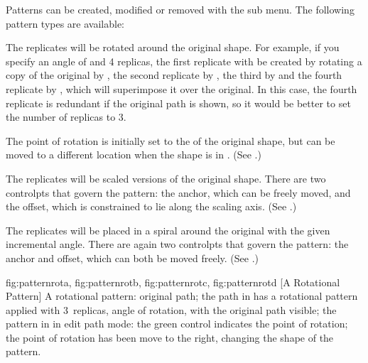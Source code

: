 Patterns can be created, modified or removed with the
 sub menu. The following pattern types
are available:
\begin{deflist}

\begin{itemdesc}
The replicates will be rotated around the original
shape. For example, if you specify an angle of  and 4
replicas, the first replicate with be created by rotating a copy of
the original by , the second replicate by ,
the third by  and the fourth replicate by
, which will superimpose it over the original.
In this case, the fourth replicate is redundant if the original path
is shown, so it would be better to set the number of replicas to 3.

The point of rotation is initially set to the  of the original
shape, but can be moved to a different location when the shape is in
\editpathmode. (See .)

\end{itemdesc}


\begin{itemdesc}
The replicates will be scaled versions of the original
shape. There are two \glspl{controlpt} that govern the pattern: the
anchor, which can be freely moved, and the offset, which is
constrained to lie along the scaling axis. (See
.)
\end{itemdesc}


\begin{itemdesc}
The replicates will be placed in a spiral around the
original with the given incremental angle. There are again two
\glspl{controlpt} that govern the pattern: the anchor and offset,
which can both be moved freely. (See .)
\end{itemdesc}

\end{deflist}

{
  {fig:patternrota}{}{},
  {fig:patternrotb}{}{},
  {fig:patternrotc}{}{},
  {fig:patternrotd}{}{}
}
[A Rotational Pattern]
{A rotational pattern: 
 original path; 
 the path 
in  has a rotational pattern applied with 3~replicas, 
 angle of rotation, with the original path visible; 
 the pattern 
in  in edit path mode:
the green control indicates the point of rotation;
 the
point of rotation has been move to the right, changing the shape of
the pattern.}

